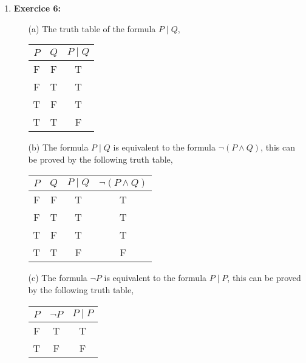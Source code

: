 \documentclass{article} %
\begin{document}
\begin{enumerate}
\begin{itemize}
    \end{itemize}

    \item \textbf{Exercice 6:}
    \begin{itemize}
        \item[(a)] The truth table of the formula $P \mid Q$,
        \begin{center}
        \begin{tabular}{ccc}
            $P$ & $Q$ & $P \mid Q$ \\
            \hline
            F & F & T \\
            F & T & T \\
            T & F & T \\
            T & T & F \\
        \end{tabular}
        \end{center}
        \item[(b)] The formula $P \mid Q$ is equivalent to the formula $\neg (P \land Q)$, this can be proved by the following truth table,
        \begin{center}
        \begin{tabular}{cccc}
            $P$ & $Q$ & $P \mid Q$ & $\neg (P \land Q)$ \\
            \hline
            F & F & T & T \\
            F & T & T & T \\
            T & F & T & T \\
            T & T & F & F \\
        \end{tabular}
        \end{center}
        \item[(c)] The formula $\neg P$ is equivalent to the formula $P \mid P$, this can be proved by the following truth table,
        \begin{center}
        \begin{tabular}{ccc}
            $P$ & $\neg P$ & $P \mid P$ \\
            \hline
            F & T & T \\
            T & F & F \\
        \end{tabular}
        \end{center}


\end{itemize}
\end{enumerate}
\end{document}
